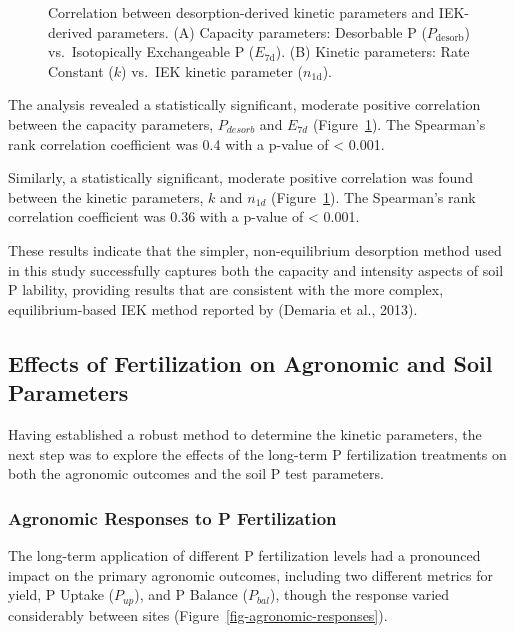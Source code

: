 \documentclass[
  a4paper,
]{article}
\begin{document}
\begin{figure}
\begin{minipage}{0.50\linewidth}
{}


\end{minipage}%

\caption{\label{fig-iek-comparison}Correlation between
desorption-derived kinetic parameters and IEK-derived parameters. (A)
Capacity parameters: Desorbable P (\(P_{\text{desorb}}\))
vs.~Isotopically Exchangeable P (\(E_{\text{7d}}\)). (B) Kinetic
parameters: Rate Constant (\(k\)) vs.~IEK kinetic parameter
(\(n_{\text{1d}}\)).}

\end{figure}%

The analysis revealed a statistically significant, moderate positive
correlation between the capacity parameters, \(P_{desorb}\) and
\(E_{7d}\) (Figure~\ref{fig-iek-comparison}). The Spearman's rank
correlation coefficient was 0.4 with a p-value of \textless{} 0.001.

Similarly, a statistically significant, moderate positive correlation
was found between the kinetic parameters, \(k\) and \(n_{1d}\)
(Figure~\ref{fig-iek-comparison}). The Spearman's rank correlation
coefficient was 0.36 with a p-value of \textless{} 0.001.

These results indicate that the simpler, non-equilibrium desorption
method used in this study successfully captures both the capacity and
intensity aspects of soil P lability, providing results that are
consistent with the more complex, equilibrium-based IEK method reported
by (Demaria et al., 2013).

\subsection{Effects of Fertilization on Agronomic and Soil
Parameters}\label{sec-effects-of-fertilization-on-agronomic-and-soil-parameters}

Having established a robust method to determine the kinetic parameters,
the next step was to explore the effects of the long-term P
fertilization treatments on both the agronomic outcomes and the soil P
test parameters.

\subsubsection{Agronomic Responses to P
Fertilization}\label{sec-agronomic-responses-to-p-fertilization}

The long-term application of different P fertilization levels had a
pronounced impact on the primary agronomic outcomes, including two
different metrics for yield, P Uptake (\(P_{up}\)), and P Balance
(\(P_{bal}\)), though the response varied considerably between sites
(Figure~\ref{fig-agronomic-responses}).
\end{document}

